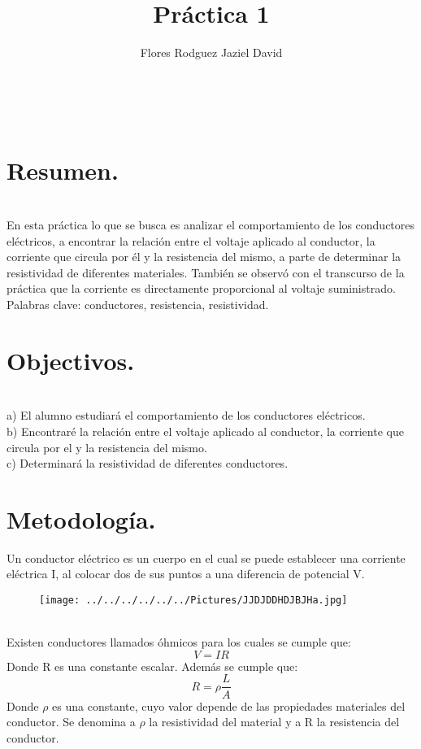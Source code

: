 \documentclass[11pt,a4paper]{article}
\author{Flores Rodguez Jaziel David }
\title{Práctica 1}
\begin{document}
\tableofcontents
\\
\medskip
\medskip
\section{Resumen.}
\\
En esta pr\'{a}ctica lo que se busca es analizar el comportamiento de los conductores el\'{e}ctricos, a encontrar la relaci\'{o}n entre el voltaje aplicado al conductor, la corriente que circula por \'{e}l y la resistencia del mismo, a parte de determinar la resistividad de diferentes materiales. Tambi\'{e}n se observ\'{o} con el transcurso de la pr\'{a}ctica que la corriente es directamente proporcional al voltaje suministrado.
\\
\medskip
Palabras clave: conductores, resistencia, resistividad.


\section{Objectivos.}\\

a) El alumno estudiar\'{a} el comportamiento de los conductores el\'{e}ctricos.\\
b) Encontrar\'{e} la relaci\'{o}n entre el voltaje aplicado al conductor, la corriente que circula por el y la resistencia del mismo.\\
c) Determinar\'{a} la resistividad de diferentes conductores. \\
\pagebreak


\section{Metodolog\'{i}a.}
Un conductor el\'{e}ctrico es un cuerpo en el cual se puede establecer una corriente el\'{e}ctrica I, al colocar dos de sus puntos a una diferencia de potencial V.  
\begin{figure}[hbtp]
\centering
\texttt{[image: ../../../../../../Pictures/JJDJDDHDJBJHa.jpg]}
\end{figure}
\\
Existen conductores llamados \'{o}hmicos para los cuales se cumple que: 
\[V= IR\]
Donde R es una constante escalar. Adem\'{a}s se cumple que:
\[R= \rho \frac{L}{A}\]
Donde $\rho$ es una constante, cuyo valor depende de las propiedades materiales del conductor. Se denomina a $\rho$ la resistividad del material y a R la resistencia del conductor. 
\end{document}

